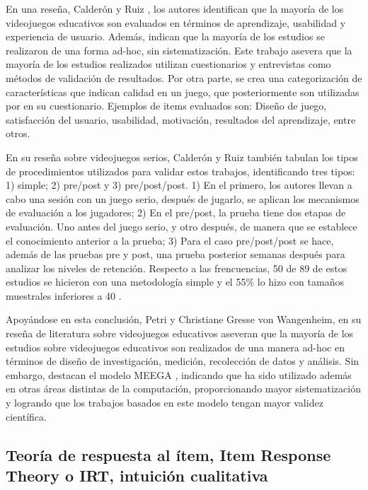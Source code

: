 En una reseña, Calderón y Ruiz \cite{CalderonRuizReviewSeriousGamesEvaluation}, los autores identifican que la mayoría de los videojuegos educativos son evaluados en términos de aprendizaje, usabilidad y experiencia de usuario. Además, indican que la mayoría de los estudios se realizaron de una forma ad-hoc, sin sistematización. Este trabajo asevera que la mayoría de los estudios realizados utilizan cuestionarios y entrevistas como métodos de validación de resultados. Por otra parte, se crea una categorización de características que indican calidad en un juego, que posteriormente son utilizadas por \cite{meegaplus} en su cuestionario. Ejemplos de items evaluados son: Diseño de juego, satisfacción del usuario, usabilidad, motivación, resultados del aprendizaje, entre otros.

En su reseña sobre videojuegos serios, Calderón y Ruiz \cite{CalderonRuizReviewSeriousGamesEvaluation} también tabulan los tipos de procedimientos utilizados para validar estos trabajos, identificando tres tipos: 1) simple; 2) pre/post y 3) pre/post/post. 1) En el primero, los autores llevan a cabo una sesión con un juego serio, después de jugarlo, se aplican los mecanismos de evaluación a los jugadores; 2) En el pre/post, la prueba tiene dos etapas de evaluación. Uno antes del juego serio, y otro después, de manera que se establece el conocimiento anterior a la prueba; 3) Para el caso pre/post/post se hace, además de las pruebas pre y post, una prueba posterior semanas después para analizar los niveles de retención. Respecto a las frencuencias, 50 de 89 de estos estudios se hicieron con una metodología simple y el 55\% lo hizo con tamaños muestrales inferiores a 40 \cite{CalderonRuizReviewSeriousGamesEvaluation}.

Apoyándose en esta conclusión, Petri y Christiane Gresse von Wangenheim, en su reseña de literatura sobre videojuegos educativos \cite{HowGamesComputingEducationEvaluated} aseveran que la mayoría de los estudios sobre videojuegos educativos son realizados de una manera ad-hoc en términos de diseño de investigación, medición, recolección de datos y análisis. Sin embargo, destacan el modelo MEEGA \cite{meegaplusQualityEvaluationPage}, indicando que ha sido utilizado además en otras áreas distintas de la computación, proporcionando mayor sistematización y logrando que los trabajos basados en este modelo tengan mayor validez científica.


\subsection{Teoría de respuesta al ítem, Item Response Theory o IRT, intuición cualitativa}

